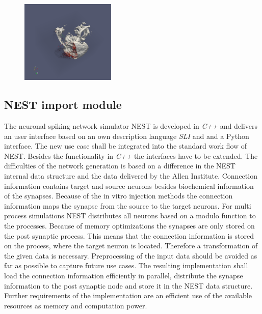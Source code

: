 \documentclass[a4paper]{article}
\begin{document}
\begin{figure}[ht!]
\centering
\includegraphics[width=0.4\textwidth]{paraview_ex.png}
\end{figure}

\subsection{NEST import module}

The neuronal spiking network simulator NEST is developed in \emph{C++} and delivers
an user interface based on an own description language \emph{SLI} and  and a Python interface.
The new use case shall be integrated into the standard work flow of NEST.
Besides the functionality in \emph{C++} the interfaces have to be extended.
The difficulties of the network generation is based on a difference in 
the NEST internal data structure and the data delivered by the Allen Institute.
Connection information contains target and source neurons besides biochemical
information of the synapses. Because of the in vitro injection methods the
connection information maps the synapse from the source to the target neurons.
For multi process simulations NEST distributes all neurons based on a modulo function 
to the processes. Because of memory optimizations the synapses are only stored on the
post synaptic process. This means that the connection information is stored
on the process, where the target neuron is located. Therefore a transformation of the given data is
necessary. Preprocessing of the input data should be avoided as far as possible to capture
future use cases.
The resulting implementation shall load the connection information efficiently in parallel,
distribute the synapse information to the post synaptic node and store it in
the NEST data structure.
Further requirements of the implementation are an efficient use of the available resources as
memory and computation power. 
\end{document}
